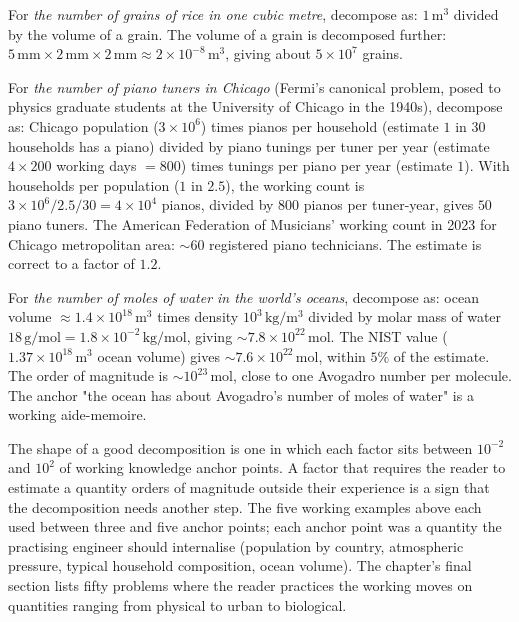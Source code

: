 For \emph{the number of grains of rice in one cubic metre},
decompose as: $1\,\si{\meter\cubed}$ divided by the volume of a
grain. The volume of a grain is decomposed further:
$5\,\si{\milli\meter} \times 2\,\si{\milli\meter} \times 2\,\si{
\milli\meter} \approx 2 \times 10^{-8}\,\si{\meter\cubed}$,
giving about $5 \times 10^{7}$ grains.

For \emph{the number of piano tuners in Chicago} (Fermi's
canonical problem, posed to physics graduate students at the
University of Chicago in the 1940s), decompose as: Chicago
population ($3 \times 10^{6}$) times pianos per household
(estimate $1$ in $30$ households has a piano) divided by piano
tunings per tuner per year (estimate $4 \times 200$ working days
$= 800$) times tunings per piano per year (estimate $1$). With
households per population ($1$ in $2.5$), the working count is
$3 \times 10^{6}/2.5/30 = 4 \times 10^{4}$ pianos, divided by
$800$ pianos per tuner-year, gives $50$ piano tuners. The
American Federation of Musicians' working count in 2023 for
Chicago metropolitan area: $\sim 60$ registered piano
technicians. The estimate is correct to a factor of $1.2$.

For \emph{the number of moles of water in the world's oceans},
decompose as: ocean volume $\approx 1.4 \times 10^{18}\,\si{
\meter\cubed}$ times density $10^{3}\,\si{\kilo\gram\per\meter
\cubed}$ divided by molar mass of water $18\,\si{\gram\per\mol}
= 1.8 \times 10^{-2}\,\si{\kilo\gram\per\mol}$, giving
$\sim 7.8 \times 10^{22}\,\si{\mol}$. The NIST value
($1.37 \times 10^{18}\,\si{\meter\cubed}$ ocean volume) gives
$\sim 7.6 \times 10^{22}\,\si{\mol}$, within $5\%$ of the
estimate. The order of magnitude is $\sim 10^{23}\,\si{\mol}$,
close to one Avogadro number per molecule. The anchor "the
ocean has about Avogadro's number of moles of water" is a
working aide-memoire.

The shape of a good decomposition is one in which each factor
sits between $10^{-2}$ and $10^{2}$ of working knowledge anchor
points. A factor that requires the reader to estimate a quantity
orders of magnitude outside their experience is a sign that the
decomposition needs another step. The five working examples
above each used between three and five anchor points; each
anchor point was a quantity the practising engineer should
internalise (population by country, atmospheric pressure,
typical household composition, ocean volume). The chapter's
final section lists fifty problems where the reader practices
the working moves on quantities ranging from physical to urban
to biological.

